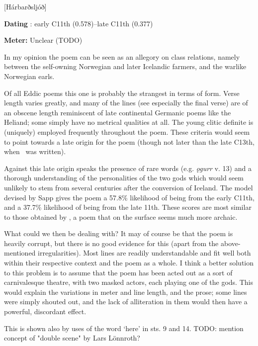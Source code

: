 [Hárbarðsljóð]

\begin{flushright}%
\textbf{Dating} \parencite{Sapp2022}: early C11th (0.578)–late C11th (0.377)

\textbf{Meter:} Unclear (TODO)%
\end{flushright}

In my opinion the poem can be seen as an allegory on class relations, namely between the self-owning Norwegian and later Icelandic farmers, and the warlike Norwegian earls.

Of all Eddic poems this one is probably the strangest in terms of form. Verse length varies greatly, and many of the lines (see especially the final verse) are of an obscene length reminiscent of late continental Germanic poems like the Heliand; some simply have no metrical qualities at all. The young clitic definite is (uniquely) employed frequently throughout the poem. These criteria would seem to point towards a late origin for the poem (though not later than the late C13th, when \Regius\ was written).

Against this late origin speaks the presence of rare words (e.g. \emph{ǫgurr} v. 13) and a thorough understanding of the personalities of the two gods which would seem unlikely to stem from several centuries after the conversion of Iceland. The model devised by Sapp gives the poem a 57.8\% likelihood of being from the early C11th, and a 37.7\% likelihood of being from the late 11th. These scores are most similar to those obtained by \Gripisspa, a poem that on the surface seems much more archaic.

What could we then be dealing with? It may of course be that the poem is heavily corrupt, but there is no good evidence for this (apart from the above-mentioned irregularities). Most lines are readily understandable and fit well both within their respective context and the poem as a whole. I think a better solution to this problem is to assume that the poem has been acted out as a sort of carnivalesque theatre, with two masked actors, each playing one of the gods. This would explain the variations in meter and line length, and the prose; some lines were simply shouted out, and the lack of alliteration in them would then have a powerful, discordant effect.

This is shown also by uses of the word ‘here’ in sts. 9 and 14. TODO: mention concept of "double scene" by Lars Lönnroth?


\sectionline


